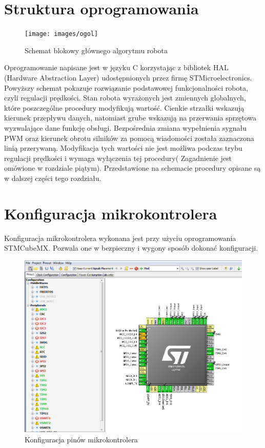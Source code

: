 \documentclass[eng,printmode]{mgr}
\begin{document}
 \section{Struktura oprogramowania}
   \begin{figure}[ht]
    \centering
    \texttt{[image: images/ogol]}
    \caption{Schemat blokowy głównego algorytmu robota}
    \label{fig:ogol}
   \end{figure}

Oprogramowanie napisane jest w języku C korzystając z bibliotek HAL (Hardware Abstraction Layer) udostępnionych przez firmę STMicroelectronics. Powyższy schemat pokazuje rozwiązanie podstawowej funkcjonalności robota, czyli regulacji prędkości. Stan robota wyrażonych jest zmiennych globalnych, które poszczególne procedury modyfikują wartość. Cienkie strzałki wskazują kierunek przepływu danych, natomiast grube wskazują na przerwania sprzętowa wyzwalające dane funkcję obsługi. Bezpośrednia zmiana wypełnienia sygnału PWM oraz kierunek obrotu silników za pomocą wiadomości została zaznaczona linią przerywaną. Modyfikacja tych wartości nie jest możliwa podczas trybu regulacji prędkości i wymaga wyłączenia tej procedury( Zagadnienie jest omówione w rozdziale piątym). Przedstawione na schemacie procedury opisane są w dalszej części tego rozdziału. 

 \section{Konfiguracja mikrokontrolera}

Konfiguracja mikrokontrolera wykonana jest przy użyciu oprogramowania STMCubeMX. Pozwala one w bezpieczny i wygony sposób dokonać konfiguracji.

   \begin{figure}[ht]
    \centering
    \includegraphics[width=1\textwidth]{images/cubemx1}
    \caption{Konfiguracja pinów mikrokontrolera}
    \label{fig:cubemx1}
   \end{figure}
\end{document}
